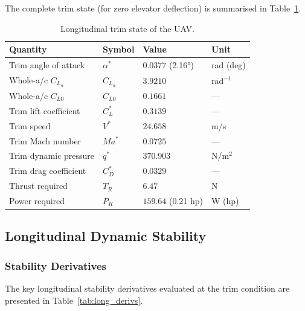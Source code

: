 The complete trim state (for zero elevator deflection) is summarised in Table~\ref{tab:trim}.

\begin{table}[H]
  \centering
  \caption{Longitudinal trim state of the UAV.}
  \label{tab:trim}
  \begin{tabular}{llll}
    \toprule
    \textbf{Quantity} & \textbf{Symbol} & \textbf{Value} & \textbf{Unit} \\
    \midrule
    Trim angle of attack   & $\alpha^*$    & $0.0377$ (\ang{2.16}) & rad (deg) \\
    Whole-a/c $C_{L_\alpha}$ & $C_{L_\alpha}$ & $3.9210$            & rad$^{-1}$ \\
    Whole-a/c $C_{L0}$     & $C_{L0}$      & $0.1661$              & ---        \\
    Trim lift coefficient  & $C_L^*$       & $0.3139$              & ---        \\
    Trim speed             & $V^*$         & $24.658$              & m/s        \\
    Trim Mach number       & $Ma^*$        & $0.0725$              & ---        \\
    Trim dynamic pressure  & $q^*$         & $370.903$             & N/m$^2$    \\
    Trim drag coefficient  & $C_D^*$       & $0.0329$              & ---        \\
    Thrust required        & $T_R$         & $6.47$                & N          \\
    Power required         & $P_R$         & $159.64$ (0.21 hp)    & W (hp)     \\
    \bottomrule
  \end{tabular}
\end{table}

\subsection{Longitudinal Dynamic Stability}
\label{subsec:long_stability}

\subsubsection{Stability Derivatives}

The key longitudinal stability derivatives evaluated at the trim condition are presented in Table~\ref{tab:long_derivs}.


